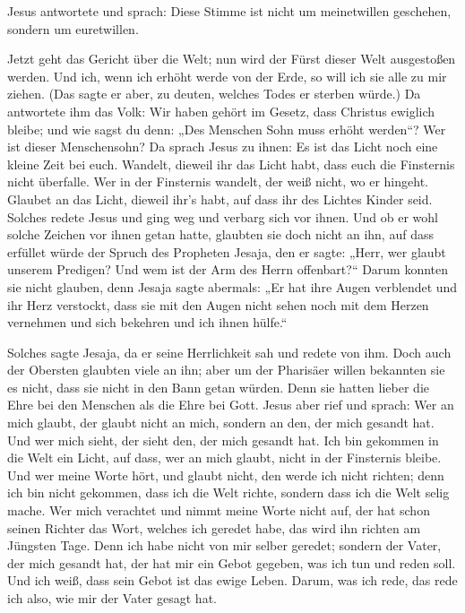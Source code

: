 Jesus antwortete und sprach: Diese Stimme ist nicht um
meinetwillen geschehen, sondern um euretwillen.

 Jetzt geht das Gericht über die Welt; nun wird der Fürst
dieser Welt ausgestoßen werden.  Und ich, wenn ich erhöht
werde von der Erde, so will ich sie alle zu mir ziehen. 
(Das sagte er aber, zu deuten, welches Todes er sterben würde.)
 Da antwortete ihm das Volk: Wir haben gehört im Gesetz,
dass Christus ewiglich bleibe; und wie sagst du denn: „Des Menschen Sohn
muss erhöht werden``? Wer ist dieser Menschensohn?  Da
sprach Jesus zu ihnen: Es ist das Licht noch eine kleine Zeit bei euch.
Wandelt, dieweil ihr das Licht habt, dass euch die Finsternis nicht
überfalle. Wer in der Finsternis wandelt, der weiß nicht, wo er hingeht.
 Glaubet an das Licht, dieweil ihr's habt, auf dass ihr
des Lichtes Kinder seid.  Solches redete Jesus und ging
weg und verbarg sich vor ihnen. Und ob er wohl solche Zeichen vor ihnen
getan hatte, glaubten sie doch nicht an ihn,  auf dass
erfüllet würde der Spruch des Propheten Jesaja, den er sagte: „Herr, wer
glaubt unserem Predigen? Und wem ist der Arm des Herrn offenbart?{}``
 Darum konnten sie nicht glauben, denn Jesaja sagte
abermals:  „Er hat ihre Augen verblendet und ihr Herz
verstockt, dass sie mit den Augen nicht sehen noch mit dem Herzen
vernehmen und sich bekehren und ich ihnen hülfe.``

 Solches sagte Jesaja, da er seine Herrlichkeit sah und
redete von ihm.  Doch auch der Obersten glaubten viele an
ihn; aber um der Pharisäer willen bekannten sie es nicht, dass sie nicht
in den Bann getan würden.  Denn sie hatten lieber die
Ehre bei den Menschen als die Ehre bei Gott.  Jesus aber
rief und sprach: Wer an mich glaubt, der glaubt nicht an mich, sondern
an den, der mich gesandt hat.  Und wer mich sieht, der
sieht den, der mich gesandt hat.  Ich bin gekommen in die
Welt ein Licht, auf dass, wer an mich glaubt, nicht in der Finsternis
bleibe.  Und wer meine Worte hört, und glaubt nicht, den
werde ich nicht richten; denn ich bin nicht gekommen, dass ich die Welt
richte, sondern dass ich die Welt selig mache.  Wer mich
verachtet und nimmt meine Worte nicht auf, der hat schon seinen Richter
das Wort, welches ich geredet habe, das wird ihn richten am Jüngsten
Tage.  Denn ich habe nicht von mir selber geredet;
sondern der Vater, der mich gesandt hat, der hat mir ein Gebot gegeben,
was ich tun und reden soll.  Und ich weiß, dass sein
Gebot ist das ewige Leben. Darum, was ich rede, das rede ich also, wie
mir der Vater gesagt hat.

